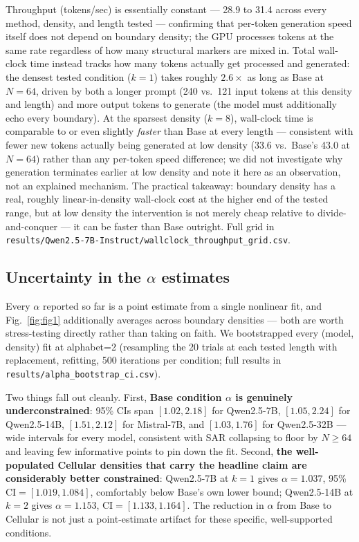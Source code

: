 \documentclass[11pt]{article}
\begin{document}
Throughput (tokens/sec) is essentially constant --- 28.9 to 31.4 across every method, density, and length tested --- confirming that per-token generation speed itself does not depend on boundary density; the GPU processes tokens at the same rate regardless of how many structural markers are mixed in. Total wall-clock time instead tracks how many tokens actually get processed and generated: the densest tested condition ($k=1$) takes roughly $2.6\times$ as long as Base at $N=64$, driven by both a longer prompt (240 vs.\ 121 input tokens at this density and length) and more output tokens to generate (the model must additionally echo every boundary). At the sparsest density ($k=8$), wall-clock time is comparable to or even slightly \emph{faster} than Base at every length --- consistent with fewer new tokens actually being generated at low density (33.6 vs.\ Base's 43.0 at $N=64$) rather than any per-token speed difference; we did not investigate why generation terminates earlier at low density and note it here as an observation, not an explained mechanism. The practical takeaway: boundary density has a real, roughly linear-in-density wall-clock cost at the higher end of the tested range, but at low density the intervention is not merely cheap relative to divide-and-conquer --- it can be faster than Base outright. Full grid in \texttt{results/Qwen2.5-7B-Instruct/wallclock\_throughput\_grid.csv}.

\subsection{Uncertainty in the $\alpha$ estimates}
\label{sec:bootstrap-ci}

Every $\alpha$ reported so far is a point estimate from a single nonlinear fit, and Fig.~\ref{fig:fig1} additionally averages across boundary densities --- both are worth stress-testing directly rather than taking on faith. We bootstrapped every (model, density) fit at alphabet=2 (resampling the 20 trials at each tested length with replacement, refitting, 500 iterations per condition; full results in \texttt{results/alpha\_bootstrap\_ci.csv}).

Two things fall out cleanly. First, \textbf{Base condition $\alpha$ is genuinely underconstrained}: 95\% CIs span $[1.02, 2.18]$ for Qwen2.5-7B, $[1.05, 2.24]$ for Qwen2.5-14B, $[1.51, 2.12]$ for Mistral-7B, and $[1.03, 1.76]$ for Qwen2.5-32B --- wide intervals for every model, consistent with SAR collapsing to floor by $N\geq 64$ and leaving few informative points to pin down the fit. Second, \textbf{the well-populated Cellular densities that carry the headline claim are considerably better constrained}: Qwen2.5-7B at $k=1$ gives $\alpha=1.037$, 95\% CI$=[1.019, 1.084]$, comfortably below Base's own lower bound; Qwen2.5-14B at $k=2$ gives $\alpha=1.153$, CI$=[1.133, 1.164]$. The reduction in $\alpha$ from Base to Cellular is not just a point-estimate artifact for these specific, well-supported conditions.
\end{document}
